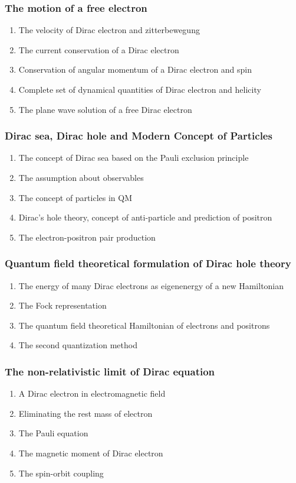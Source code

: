\documentclass[12pt]{article}
\numberwithin{equation}{section}
\begin{document}
\subsubsection{The motion of a free electron}
\begin{enumerate}
\item The velocity of Dirac electron and zitterbewegung
\item The current conservation of a Dirac electron
\item Conservation of angular momentum of a Dirac electron and spin
\item Complete set of dynamical quantities of Dirac electron and helicity
\item The plane wave solution of a free Dirac electron
\end{enumerate}
\subsubsection{Dirac sea, Dirac hole and Modern Concept of Particles}
\begin{enumerate}
\item The concept of Dirac sea based on the Pauli exclusion principle
\item The assumption about observables   
\item The concept of particles in QM
\item Dirac's hole theory, concept of anti-particle and prediction of positron
\item The electron-positron pair production
\end{enumerate}
\subsubsection{Quantum field theoretical formulation of Dirac hole theory}
\begin{enumerate}
\item The energy of many Dirac electrons as eigenenergy of a new Hamiltonian
\item The Fock representation
\item The quantum field theoretical Hamiltonian of electrons and positrons
\item The second quantization method
\end{enumerate}
\subsubsection{The non-relativistic limit of Dirac equation}
\begin{enumerate}
\item A Dirac electron in electromagnetic field
\item Eliminating the rest mass of electron
\item The Pauli equation
\item The magnetic moment of Dirac electron
\item The spin-orbit coupling
\end{enumerate}
\end{document}
